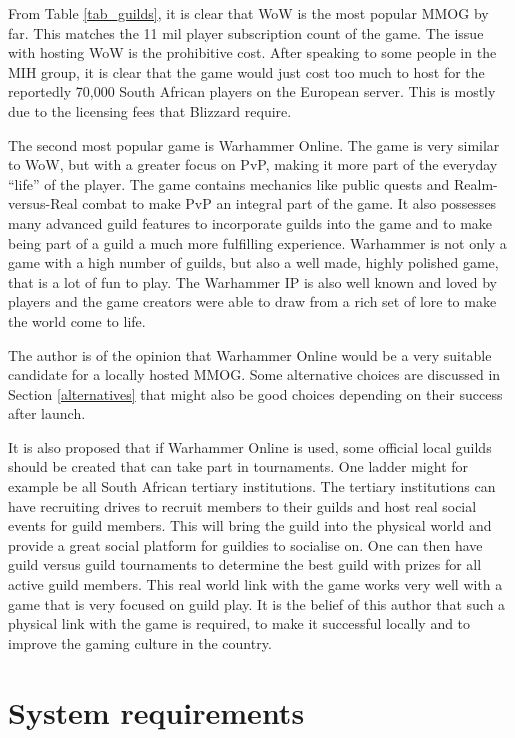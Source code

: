 \documentclass[journal,oneside,a4paper,onecolumn]{IEEEtran}
\begin{document}
From Table \ref{tab_guilds}, it is clear that \ac{WoW} is the most popular MMOG by far. This matches the 11 mil player subscription count of the
game. The issue with hosting \ac{WoW} is the prohibitive cost. After speaking to some people in the MIH group, it is clear that the game would just
cost too much to host for the reportedly 70,000 South African players on the European server. This is mostly due to the licensing fees that Blizzard
require.

The second most popular game is Warhammer Online. The game is very similar to \ac{WoW}, but with a greater focus on \ac{PvP}, making it more part of
the everyday ``life'' of the player. The game contains mechanics like public quests and Realm-versus-Real combat to make PvP an integral part of the
game. It also possesses many advanced guild features to incorporate guilds into the game and to make being part of a guild a much more fulfilling
experience. Warhammer is not only a game with a high number of guilds, but also a well made, highly polished game, that is a lot of fun to play. The
Warhammer IP is also well known and loved by players and the game creators were able to draw from a rich set of lore to make the world come to life.

The author is of the opinion that Warhammer Online would be a very suitable candidate for a locally hosted MMOG. Some alternative choices are
discussed in Section \ref{alternatives} that might also be good choices depending on their success after launch.

It is also proposed that if Warhammer Online is used, some official local guilds should be created that can take part in tournaments. One ladder
might for example be all South African tertiary institutions. The tertiary institutions can have recruiting drives to recruit members to their guilds
and host real social events for guild members. This will bring the guild into the physical world and provide a great social platform for guildies to
socialise on. One can then have guild versus guild tournaments to determine the best guild with prizes for all active guild members. This real world
link with the game works very well with a game that is very focused on guild play. It is the belief of this author that such a physical link with the
game is required, to make it successful locally and to improve the gaming culture in the country.


\section{System requirements}
\end{document}
